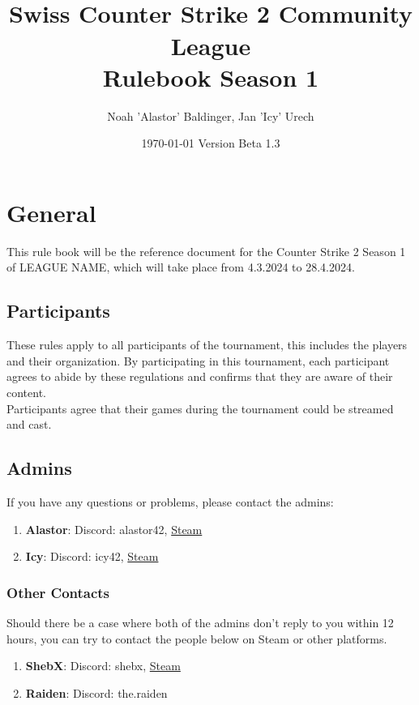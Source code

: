 \documentclass{article}
\title{\name\\ Swiss Counter Strike 2 Community League\\Rulebook Season 1}
\author{Noah 'Alastor' Baldinger, Jan 'Icy' Urech}
\date{\today \hspace{1cm} Version Beta 1.3} %
\def\name{LEAGUE NAME}
\begin{document}
\maketitle
\tableofcontents

\pagebreak
\section{General}
This rule book will be the reference document for the Counter Strike 2 Season 1 of \name, which will take place from 4.3.2024 to 28.4.2024. 

\subsection{Participants}
These rules apply to all participants of the tournament, this includes the players and their organization. By participating in this tournament, each participant agrees to abide by these regulations and confirms that they are aware of their content.\\
Participants agree that their games during the tournament could be streamed and cast.


\subsection{Admins}\label{admins}
If you have any questions or problems, please contact the admins:
\begin{enumerate}
    \item \textbf{Alastor}: Discord: alastor42, \href{https://steamcommunity.com/id/-rotsala-/}{Steam}
    \item \textbf{Icy}: Discord: icy42, \href{https://steamcommunity.com/id/icyq}{Steam}
\end{enumerate}
\subsubsection{Other Contacts}
Should there be a case where both of the admins don't reply to you within 12 hours, you can try to contact the people below on 
Steam or other platforms.
\begin{enumerate}
    \item \textbf{ShebX}: Discord: shebx, \href{https://steamcommunity.com/id/ShebX}{Steam}
    \item \textbf{Raiden}: Discord: the.raiden
\end{enumerate}
\end{document}
